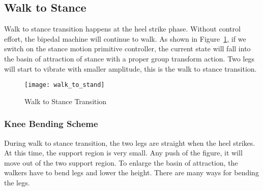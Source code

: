 \subsection{Walk to Stance}
Walk to stance transition happens at the heel strike phase.
Without control effort, the bipedal machine will continue to walk.
As shown in Figure~\ref{fig:walksstance}, if we switch on the stance motion primitive controller, the current state will fall into the basin of attraction of stance with a proper group transform action. 
Two legs will start to vibrate with smaller amplitude, this is the walk to stance transition.

\begin{figure}[!htbp]
  \begin{center}
    \texttt{[image: walk\_to\_stand]}
    \caption{Walk to Stance Transition}
    \label{fig:walksstance}
	\end{center}
\end{figure}







\subsubsection*{Knee Bending Scheme}
During walk to stance transition, the two legs are straight when the heel strikes.
At this time, the support region is very small.
Any push of the figure, it will move out of the two support region.
To enlarge the basin of attraction, the walkers have to bend legs and lower the height.
There are many ways for bending the legs.


